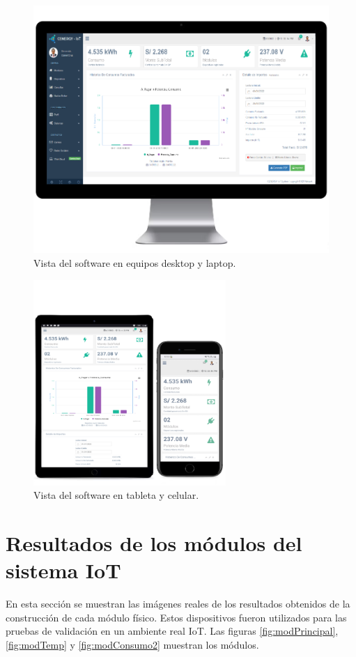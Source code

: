 \begin{figure}[htpb]
\centering 
\includegraphics[width=0.62 \textwidth]{./Figures/responsive1.png}
\caption{Vista del software en equipos desktop y laptop.}
\label{fig:software1}
\end{figure}

\vspace{1.0cm}
\begin{figure}[htpb]
\centering 
\includegraphics[width=0.65\textwidth]{./Figures/responsive2.png}
\caption{Vista del software en tableta y celular.}
\label{fig:software2}
\end{figure}

\vspace{1.0cm}
\section{Resultados de los módulos del sistema IoT}
En esta sección se muestran las imágenes reales de los resultados obtenidos de la construcción de cada módulo físico. Estos dispositivos fueron utilizados para las pruebas de validación en un ambiente real IoT. Las figuras \ref{fig:modPrincipal}, \ref{fig:modTemp} y \ref{fig:modConsumo2} muestran los módulos.

